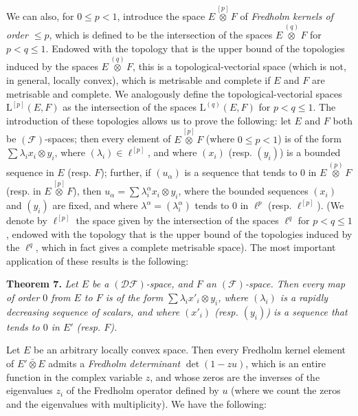 \documentclass[british]{article}
\newenvironment{itenv}[1]
  {\phantomsection\par\smallskip\noindent\textbf{#1.}\itshape}
  {\par\smallskip}
\begin{document}
We can also, for \(0\leqslant p<1\), introduce the space
\(E\overset{[p]}{\otimes}F\) of \emph{Fredholm kernels of order
\(\leqslant p\)}, which is defined to be the intersection of the spaces
\(E\overset{(q)}{\otimes} F\) for \(p<q\leqslant 1\). Endowed with the
topology that is the upper bound of the topologies induced by the spaces
\(E\overset{(q)}{\otimes} F\), this is a topological-vectorial space
(which is not, in general, locally convex), which is metrisable and
complete if \(E\) and \(F\) are metrisable and complete. We analogously
define the topological-vectorial spaces \(\mathrm{L}^{[p]}(E,F)\) as the
intersection of the spaces \(\mathrm{L}^{(q)}(E,F)\) for
\(p<q\leqslant 1\). The introduction of these topologies allows us to
prove the following: let \(E\) and \(F\) both be
\((\mathscr{F})\)-spaces; then every element of
\(E\overset{[p]}{\otimes}F\) (where \(0\leqslant p<1\)) is of the form
\(\sum\lambda_i x_i\otimes y_i\), where \((\lambda_i)\in\ell^{[p]}\),
and where \((x_i)\) (resp. \((y_i)\)) is a bounded sequence in \(E\)
(resp. \(F\)); further, if \((u_\alpha)\) is a sequence that tends to
\(0\) in \(E\overset{(p)}{\otimes}F\) (resp. in
\(E\overset{[p]}{\otimes}F\)), then
\(u_\alpha=\sum\lambda_i^\alpha x_i\otimes y_i\), where the bounded
sequences \((x_i)\) and \((y_i)\) are fixed, and where
\(\lambda^\alpha=(\lambda_i^\alpha)\) tends to \(0\) in \(\ell^p\)
(resp. \(\ell^{[p]}\)). (We denote by \(\ell^{[p]}\) the space given by
the intersection of the spaces \(\ell^q\) for \(p<q\leqslant 1\),
endowed with the topology that is the upper bound of the topologies
induced by the \(\ell^q\), which in fact gives a complete metrisable
space). The most important application of these results is the
following:

\protect{}\label{section-2-theorem-7}
\begin{itenv}{Theorem 7}
Let \(E\) be a \((\mathscr{DF})\)-space, and \(F\) an
\((\mathscr{F})\)-space. Then every map of order \(0\) from \(E\) to
\(F\) is of the form \(\sum\lambda_i x'_i\otimes y_i\), where
\((\lambda_i)\) is a \emph{rapidly decreasing} sequence of scalars, and
where \((x'_i)\) (resp. \((y_i)\)) is a sequence that tends to \(0\) in
\(E'\) (resp. \(F\)).

\end{itenv}

Let \(E\) be an arbitrary locally convex space. Then every Fredholm
kernel element of \(E'\bar{\otimes}E\) admits a \emph{Fredholm
determinant} \(\det(1-zu)\), which is an entire function in the complex
variable \(z\), and whose zeros are the inverses of the eigenvalues
\(z_i\) of the Fredholm operator defined by \(u\) (where we count the
zeros and the eigenvalues with multiplicity). We have the following:
\end{document}
